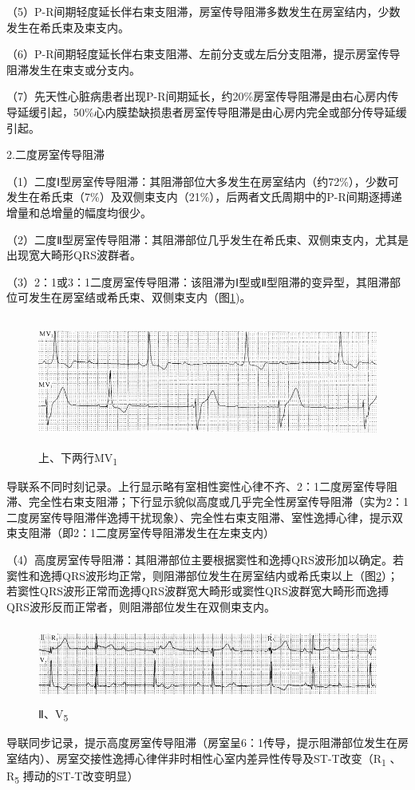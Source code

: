 （5）P-R间期轻度延长伴右束支阻滞，房室传导阻滞多数发生在房室结内，少数发生在希氏束及束支内。

（6）P-R间期轻度延长伴右束支阻滞、左前分支或左后分支阻滞，提示房室传导阻滞发生在束支或分支内。

（7）先天性心脏病患者出现P-R间期延长，约20\%房室传导阻滞是由右心房内传导延缓引起，50\%心内膜垫缺损患者房室传导阻滞是由心房内完全或部分传导延缓引起。

2.二度房室传导阻滞

（1）二度Ⅰ型房室传导阻滞：其阻滞部位大多发生在房室结内（约72\%），少数可发生在希氏束（7\%）及双侧束支内（21\%），后两者文氏周期中的P-R间期逐搏递增量和总增量的幅度均很少。

（2）二度Ⅱ型房室传导阻滞：其阻滞部位几乎发生在希氏束、双侧束支内，尤其是出现宽大畸形QRS波群者。

（3）2：1或3：1二度房室传导阻滞：该阻滞为Ⅰ型或Ⅱ型阻滞的变异型，其阻滞部位可发生在房室结或希氏束、双侧束支内（图\ref{fig20-11})。

\begin{figure}[!htbp]
 \centering
 \includegraphics[width=5.58333in,height=1.6875in]{./images/Image00340.jpg}
 \captionsetup{justification=centering}
 \caption{上、下两行MV\textsubscript{1}}
 \label{fig20-11}
  \end{figure} 
导联系不同时刻记录。上行显示略有室相性窦性心律不齐、2：1二度房室传导阻滞、完全性右束支阻滞；下行显示貌似高度或几乎完全性房室传导阻滞（实为2：1二度房室传导阻滞伴逸搏干扰现象）、完全性右束支阻滞、室性逸搏心律，提示双束支阻滞（即2：1二度房室传导阻滞发生在左束支内）

（4）高度房室传导阻滞：其阻滞部位主要根据窦性和逸搏QRS波形加以确定。若窦性和逸搏QRS波形均正常，则阻滞部位发生在房室结内或希氏束以上（图\ref{fig20-12}）；若窦性QRS波形正常而逸搏QRS波群宽大畸形或窦性QRS波群宽大畸形而逸搏QRS波形反而正常者，则阻滞部位发生在双侧束支内。

\begin{figure}[!htbp]
 \centering
 \includegraphics[width=5.58333in,height=1in]{./images/Image00341.jpg}
 \captionsetup{justification=centering}
 \caption{Ⅱ、V\textsubscript{5}}
 \label{fig20-12}
  \end{figure} 
导联同步记录，提示高度房室传导阻滞（房室呈6：1传导，提示阻滞部位发生在房室结内）、房室交接性逸搏心律伴非时相性心室内差异性传导及ST-T改变（R\textsubscript{1}
、R\textsubscript{5} 搏动的ST-T改变明显）

